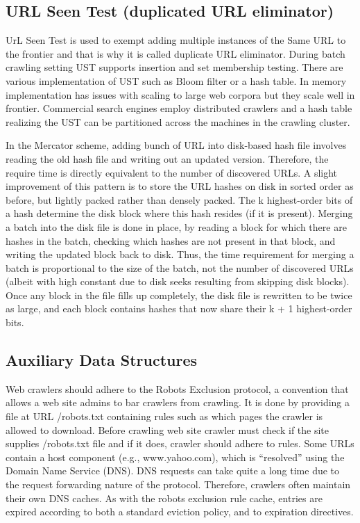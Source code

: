 \documentclass[12pt]{report}
\begin{document}
\subsection*{URL Seen Test (duplicated URL eliminator)}
UrL Seen Test is used to exempt adding multiple instances of the Same URL to the frontier and that is why it is called duplicate URL eliminator. During batch crawling setting UST supports insertion and set membership testing. There are various implementation of UST such as Bloom filter or a hash table. In memory implementation has issues with scaling to large web corpora but they scale well in frontier. Commercial search engines employ distributed crawlers and a hash table realizing the UST can be partitioned across the machines in the crawling cluster.

In the Mercator scheme, adding bunch of URL into disk-based hash file involves reading the old hash file and writing out an updated version. Therefore, the require  time is directly equivalent to the number of discovered URLs. A slight improvement of this pattern is to store the URL hashes on disk in sorted order as before, but lightly packed rather than densely packed. The k highest-order bits of a hash determine the disk block where this hash resides (if it is present). Merging a batch into the disk file is done in place, by reading a block for which there are hashes in the batch, checking which hashes are not present in that block, and writing the updated block back to disk. Thus, the time requirement for merging a batch is proportional to the size of the batch, not the number of discovered URLs (albeit with high constant due to disk seeks resulting from skipping disk blocks). Once any block in the file fills up completely, the disk file is rewritten to be twice as large, and each block contains hashes that now share their k + 1 highest-order bits.

\subsection*{Auxiliary Data Structures}
Web crawlers should adhere to the Robots Exclusion protocol, a convention that allows a web site admins to bar crawlers from crawling.  It is done by providing a file at URL /robots.txt containing rules such as which pages the crawler is allowed to download. Before crawling web site crawler must check if the site supplies /robots.txt file and if it does, crawler should adhere to rules. Some URLs contain a host component (e.g., www.yahoo.com), which is “resolved” using the Domain Name Service (DNS). DNS requests can take quite a long time due to the request forwarding nature of the protocol. Therefore, crawlers often maintain their own DNS caches. As with the robots exclusion rule cache, entries are expired according to both a standard eviction policy, and to expiration directives.
\end{document}
